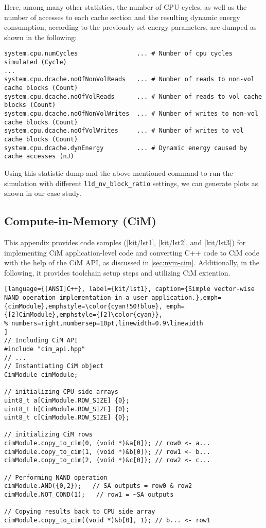 Here, among many other statistics, the number of CPU cycles, as well as the number of accesses to each cache section and the resulting dynamic energy consumption, according to the previously set energy parameters, are dumped as shown in the following:
\begin{lstlisting}
system.cpu.numCycles                ... # Number of cpu cycles simulated (Cycle)
...
system.cpu.dcache.noOfNonVolReads   ... # Number of reads to non-vol cache blocks (Count)
system.cpu.dcache.noOfVolReads      ... # Number of reads to vol cache blocks (Count)
system.cpu.dcache.noOfNonVolWrites  ... # Number of writes to non-vol cache blocks (Count)
system.cpu.dcache.noOfVolWrites     ... # Number of writes to vol cache blocks (Count)
system.cpu.dcache.dynEnergy         ... # Dynamic energy caused by cache accesses (nJ)
\end{lstlisting}
Using this statistic dump and the above mentioned command to run the simulation with different \texttt{l1d\_nv\_block\_ratio} settings, we can generate plots as shown in our case study.
\subsection*{Compute-in-Memory (CiM)}
This appendix provides code samples (\cref{kit/lst1}, \cref{kit/lst2}, and \cref{kit/lst3}) for implementing CiM application-level code and converting C++ code to CiM code with the help of the CiM API, as discussed in \cref{sec:nvm-cim}.
Additionally, in the following, it provides toolchain setup steps and utilizing CiM extention.

\begin{lstlisting}[language={[ANSI]C++}, label={kit/lst1}, caption={Simple vector-wise NAND operation implementation in a user application.},emph={cimModule},emphstyle=\color{cyan!50!blue}, emph={[2]CimModule},emphstyle={[2]\color{cyan}},
% numbers=right,numbersep=10pt,linewidth=0.9\linewidth
]
// Including CiM API
#include "cim_api.hpp"      
// ...
// Instantiating CiM object
CimModule cimModule;

// initializing CPU side arrays
uint8_t a[CimModule.ROW_SIZE] {0};
uint8_t b[CimModule.ROW_SIZE] {0};
uint8_t c[CimModule.ROW_SIZE] {0};

// initializing CiM rows
cimModule.copy_to_cim(0, (void *)&a[0]); // row0 <- a...
cimModule.copy_to_cim(1, (void *)&b[0]); // row1 <- b...
cimModule.copy_to_cim(2, (void *)&c[0]); // row2 <- c...

// Performing NAND operation
cimModule.AND({0,2});   // SA outputs = row0 & row2
cimModule.NOT_COND(1);   // row1 = ~SA outputs

// Copying results back to CPU side array
cimModule.copy_to_cim((void *)&b[0], 1); // b... <- row1
\end{lstlisting}

